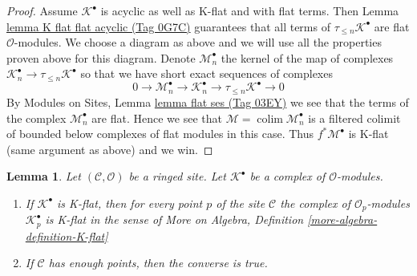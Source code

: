 \documentclass{amsart}
\theoremstyle{plain}
\newtheorem{lemma}[subsection]{Lemma}
\theoremstyle{definition}
\theoremstyle{remark}
\numberwithin{equation}{subsection}
\def\colim{\mathop{\mathrm{colim}}\nolimits}
\begin{document}
\begin{proof}
\medskip\noindent
Assume $\mathcal{K}^\bullet$ is acyclic as well as K-flat and
with flat terms. Then Lemma \href{https://stacks.math.columbia.edu/tag/0G7C}{lemma K flat flat acyclic (Tag 0G7C)}
guarantees that all terms of $\tau_{\leq n}\mathcal{K}^\bullet$
are flat $\mathcal{O}$-modules. We choose a diagram as above and
we will use all the properties proven above for this diagram.
Denote $\mathcal{M}_n^\bullet$ the kernel of the map of complexes
$\mathcal{K}_n^\bullet \to \tau_{\leq n}\mathcal{K}^\bullet$
so that we have short exact sequences of complexes
$$
0 \to \mathcal{M}_n^\bullet \to \mathcal{K}_n^\bullet \to
\tau_{\leq n}\mathcal{K}^\bullet \to 0
$$
By Modules on Sites, Lemma \href{https://stacks.math.columbia.edu/tag/03EY}{lemma flat ses (Tag 03EY)}
we see that the terms of the complex $\mathcal{M}_n^\bullet$ are flat.
Hence we see that $\mathcal{M} = \colim \mathcal{M}_n^\bullet$
is a filtered colimit of bounded below complexes of flat modules
in this case. Thus $f^*\mathcal{M}^\bullet$ is K-flat
(same argument as above) and we win.
\end{proof}


\begin{lemma}
\label{lemma-check-K-flat-stalks}
Let $(\mathcal{C}, \mathcal{O})$ be a ringed site.
Let $\mathcal{K}^\bullet$ be a complex of $\mathcal{O}$-modules.
\begin{enumerate}
\item If $\mathcal{K}^\bullet$ is K-flat, then for every point $p$
of the site $\mathcal{C}$ the complex of $\mathcal{O}_p$-modules
$\mathcal{K}_p^\bullet$ is K-flat in the sense of
More on Algebra, Definition \ref{more-algebra-definition-K-flat}
\item If $\mathcal{C}$ has enough points, then the converse is true.
\end{enumerate}
\end{lemma}
\end{document}
